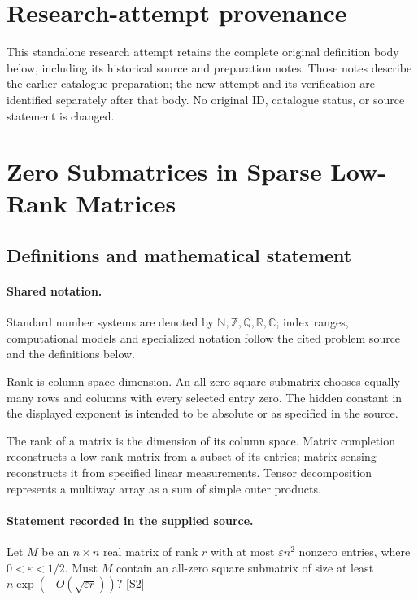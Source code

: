 \documentclass[11pt]{article}
\begin{document}
\section*{Research-attempt provenance}
This standalone research attempt retains the complete original definition body below,
including its historical source and preparation notes. Those notes describe the
earlier catalogue preparation; the new attempt and its verification are identified
separately after that body. No original ID, catalogue status, or source statement is changed.

\section{Zero Submatrices in Sparse Low-Rank Matrices}\label{statement}

\subsection{Definitions and mathematical statement}

\paragraph{Shared notation.}Standard number systems are denoted by $\mathbb N,\mathbb Z,\mathbb Q,\mathbb R,\mathbb C$; index ranges, computational models and specialized notation follow the cited problem source and the definitions below.


Rank is column-space dimension. An all-zero square submatrix chooses equally many rows and columns with every selected entry zero. The hidden constant in the displayed exponent is intended to be absolute or as specified in the source.

The rank of a matrix is the dimension of its column space. Matrix completion reconstructs a low-rank matrix from a subset of its entries; matrix sensing reconstructs it from specified linear measurements. Tensor decomposition represents a multiway array as a sum of simple outer products.
\paragraph{Statement recorded in the supplied source.}
Let $M$ be an $n\times n$ real matrix of rank $r$ with at most $\varepsilon n^2$ nonzero entries, where $0<\varepsilon<1/2$. Must $M$ contain an all-zero square submatrix of size at least $n\exp\!\left(-O(\sqrt{\varepsilon r})\right)$? \href{https://doi.org/10.4171/owr/2025/42}{[S2]}
\end{document}
